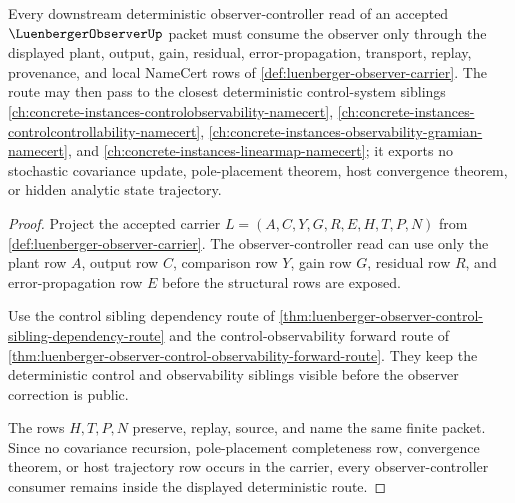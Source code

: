 \begin{theorem}
\label{thm:luenberger-observer-controller-forward-route}
Every downstream deterministic observer-controller read of an accepted $\LuenbergerObserverUp$ packet must consume the observer only through the displayed plant, output, gain, residual, error-propagation, transport, replay, provenance, and local NameCert rows of \autoref{def:luenberger-observer-carrier}. The route may then pass to the closest deterministic control-system siblings \autoref{ch:concrete-instances-controlobservability-namecert}, \autoref{ch:concrete-instances-controlcontrollability-namecert}, \autoref{ch:concrete-instances-observability-gramian-namecert}, and \autoref{ch:concrete-instances-linearmap-namecert}; it exports no stochastic covariance update, pole-placement theorem, host convergence theorem, or hidden analytic state trajectory.
\end{theorem}
\begin{proof}
Project the accepted carrier $L=(A,C,Y,G,R,E,H,T,P,N)$ from \autoref{def:luenberger-observer-carrier}. The observer-controller read can use only the plant row $A$, output row $C$, comparison row $Y$, gain row $G$, residual row $R$, and error-propagation row $E$ before the structural rows are exposed.

Use the control sibling dependency route of \autoref{thm:luenberger-observer-control-sibling-dependency-route} and the control-observability forward route of \autoref{thm:luenberger-observer-control-observability-forward-route}. They keep the deterministic control and observability siblings visible before the observer correction is public.

The rows $H,T,P,N$ preserve, replay, source, and name the same finite packet. Since no covariance recursion, pole-placement completeness row, convergence theorem, or host trajectory row occurs in the carrier, every observer-controller consumer remains inside the displayed deterministic route.
\end{proof}
